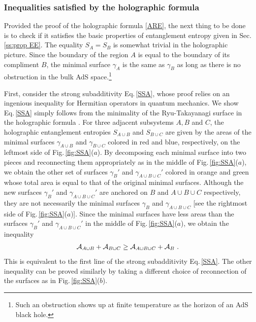 \subsubsection{Inequalities satisfied by the holographic formula}\label{ss:HEE_Ineq}
Provided the proof of the holographic formula \eqref{ARE}, the next thing to be done is to check if it satisfies the basic properties of entanglement entropy given in Sec. \ref{ss:prop EE}.
The equality $S_A=S_B$ is somewhat trivial in the holographic picture.
Since the boundary of the region $A$ is equal to the boundary of its compliment $B$, 
the minimal surface $\gamma_A$ is the same as $\gamma_B$ as long as there is no obstruction in the bulk AdS space.\footnote{Such an obstruction shows up at finite temperature as the horizon of an AdS black hole.}

First, consider the strong subadditivity Eq.\,\eqref{SSA}, whose proof relies on an ingenious inequality for Hermitian operators in quantum mechanics.
We show Eq.\,\eqref{SSA} simply follows from the minimality of the Ryu-Takayanagi surface in the holographic formula \cite{Headrick:2007km,Headrick:2013zda}.
For three adjacent subsystems $A,B$ and $C$, the holographic entanglement entropies $S_{A\cup B}$ and $S_{B\cup C}$ are given by the areas of the minimal surfaces $\gamma_{A\cup B}$ and $\gamma_{B\cup C}$ colored in red and blue, respectively, on the leftmost side of Fig.\,\ref{fig:SSA}($a$).
By decomposing each minimal surface into two pieces and reconnecting them appropriately as in the middle of Fig.\,\ref{fig:SSA}($a$), 
we obtain the other set of surfaces $\gamma_B'$ and $\gamma_{A\cup B\cup C}'$ colored in orange and green
whose total area is equal to that of the original minimal surfaces.
Although the new surfaces $\gamma_B'$ and $\gamma_{A\cup B\cup C}'$ are anchored on $B$ and $A\cup B\cup C$ respectively, they are not necessarily the minimal surfaces $\gamma_B$ and $\gamma_{A\cup B\cup C}$ [see the rightmost side of Fig.\,\ref{fig:SSA}($a$)].
Since the minimal surfaces have less areas than the surfaces $\gamma_B'$ and $\gamma_{A\cup B\cup C}'$ in the middle of Fig.\,\ref{fig:SSA}($a$), we obtain the inequality
\begin{align}\label{Hol_SSA_1}
{\cal A}_{A\cup B} + {\cal A}_{B\cup C} \ge {\cal A}_{A\cup B\cup C} + {\cal A}_{B} \ .
\end{align}
This is equivalent to the first line of the strong subadditivity Eq.\,\eqref{SSA}.
The other inequality can be proved similarly by taking a different choice of reconnection of the surfaces as in Fig.\,\ref{fig:SSA}($b$).


